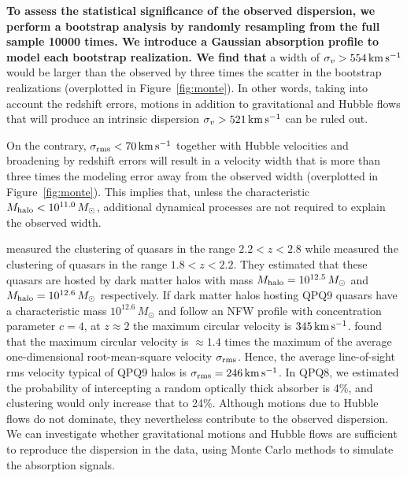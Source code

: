 \documentclass[iop]{emulateapj}
\begin{document}
{\bf To assess the statistical significance of the observed dispersion, we perform a bootstrap
analysis by randomly resampling from the full sample 10000 times. We introduce a Gaussian absorption
profile to model each bootstrap realization. We find that} a width of
$\sigma_v>554\,{\rm km\,s^{-1}}$ would be larger than the observed by three times the scatter in
the bootstrap realizations
(overplotted in Figure~\ref{fig:monte}). In other words, taking into account the redshift errors,
motions in addition to gravitational and Hubble flows that will produce an intrinsic dispersion
$\sigma_v>521\,{\rm km\,s^{-1}}$ can be ruled out.

On the contrary,
$\sigma_{\rm rms}<70\,{\rm km\,s^{-1}}$ together with Hubble velocities and
broadening by redshift errors will result in a velocity width that is more than three times the
modeling error away from the observed width (overplotted in Figure~\ref{fig:monte}). This implies
that, unless the characteristic $M_{\rm halo}<10^{11.0}\,M_\odot$,
additional dynamical processes are not required to explain the observed width.

\cite{Eftekharzadeh+15} measured the clustering of quasars in the range $2.2<z<2.8$ while
\cite{RodriguezTorres+17} measured the clustering of quasars in the range $1.8<z<2.2$. They
estimated that these quasars are hosted by dark matter halos with mass
$M_{\rm halo}=10^{12.5}\,M_\odot$ and $M_{\rm halo}=10^{12.6}\,M_\odot$ respectively. If dark
matter halos hosting QPQ9 quasars have a characteristic mass $10^{12.6}\,M_\odot$ and follow an
NFW profile \citep{NavarroFrenkWhite97} with concentration parameter $c=4$, at $z\approx2$ the
maximum circular velocity is $345\,{\rm km\,s^{-1}}$. \cite{TormenBouchetWhite97} found that the
maximum circular velocity is $\approx1.4$ times the maximum of the average one-dimensional
root-mean-square velocity $\sigma_{\rm rms}$. Hence, the average line-of-sight rms velocity
typical of QPQ9 halos is $\sigma_{\rm rms}=246\,{\rm km\,s^{-1}}$. In QPQ8, we estimated the
probability of intercepting a random optically thick absorber is 4\%, and clustering would only
increase that to 24\%. Although motions due to Hubble flows do not dominate, they nevertheless
contribute to the observed dispersion. We can investigate
whether gravitational motions and Hubble flows are sufficient to reproduce the dispersion in the
data, using Monte Carlo methods to simulate the absorption signals.
\end{document}
